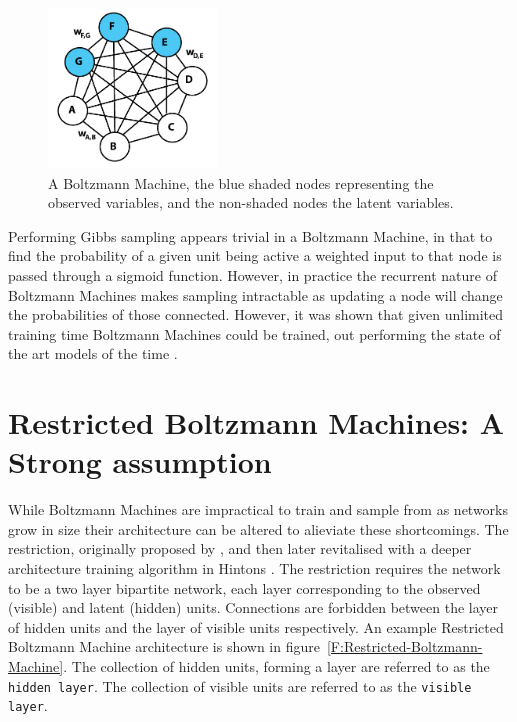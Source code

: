   \begin{figure}[h]
  \begin{center}
    \includegraphics[width = 0.4\textwidth]{Assets/Boltzmann_Machine.png}
  \caption{A Boltzmann Machine, the blue shaded nodes representing the observed variables, and the non-shaded nodes the latent variables.}
  \label{F:Boltzmann-Machine}
  \end{center}
  \end{figure}

  Performing Gibbs sampling appears trivial in a Boltzmann Machine, in that to find the probability of a given unit being active a weighted input to that node is passed through a sigmoid function. However, in practice the recurrent nature of Boltzmann Machines makes sampling intractable as updating a node will change the probabilities of those connected. However, it was shown that given unlimited training time Boltzmann Machines could be trained, out performing the state of the art models of the time .


  \section{Restricted Boltzmann Machines: A Strong assumption}

  While Boltzmann Machines are impractical to train and sample from as networks grow in size \todocite{} their architecture can be altered to alieviate these shortcomings. The restriction, originally proposed by , and then later revitalised with a deeper architecture training algorithm in Hintons \cite{geoffreye.hintonterrencej.sejnowski1983}. The restriction requires the network to be a two layer bipartite network, each layer corresponding to the observed (visible) and latent (hidden) units. Connections are forbidden between the layer of hidden units and the layer of visible units respectively. An example Restricted Boltzmann Machine architecture is shown in figure~\ref{F:Restricted-Boltzmann-Machine}. The collection of hidden units, forming a layer are referred to as the \texttt{hidden layer}. The collection of visible units are referred to as the \texttt{visible layer}.

